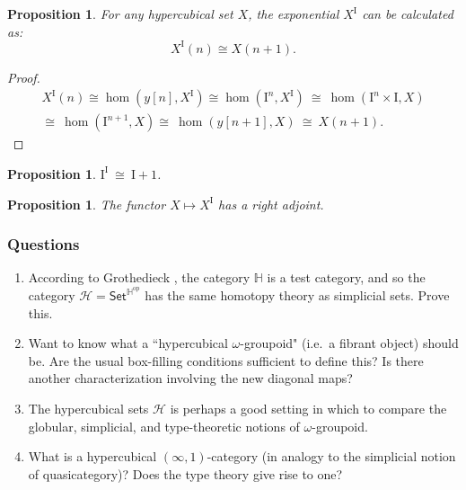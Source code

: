 \documentclass[11pt]{article}
\newcommand{\psh}[1]{\ensuremath{\mathsf{Set}^{#1^{\mathrm{op}}}}}
\newcommand{\I}{\ensuremath{\mathrm{I}}}
\renewcommand{\H}{\ensuremath{\mathbb{H}}}
\newcommand{\HH}{\ensuremath{\mathcal{H}}}
\newtheorem{proposition}[theorem]{Proposition}
\theoremstyle{remark}
\theoremstyle{definition}
\begin{document}
\begin{proposition}
For any hypercubical set $X$, the exponential $X^\I$ can be calculated as:
\[
X^\I(n) \cong X(n+1).
\]
\end{proposition}

\begin{proof}
\[
\begin{split}
X^\I(n) \cong \hom(y[n], X^\I) \cong \hom(\I^n, X^\I)\ \cong\ \hom(\I^n\times \I, X)\\
\cong\ \hom(\I^{n+1}, X)\cong\ \hom(y[n+1], X)\ \cong\ X(n+1).
\end{split}
\]
\end{proof}

\begin{proposition}
\quad $\I^\I\ \cong\ \I+1$.
\end{proposition}


\begin{proposition}
The functor $X \mapsto X^\I$ has a \emph{right} adjoint.
\end{proposition}


\subsubsection*{Questions}
\begin{enumerate}
\item According to Grothedieck \cite{PS}, the category $\H$ is a test category, and so the category $\HH = \psh{\H}$ has the same homotopy theory as simplicial sets.  Prove this.

\item Want to know what a ``hypercubical $\omega$-groupoid" (i.e.\ a fibrant object) should be.  Are the usual box-filling conditions sufficient to define this? Is there another characterization involving the new diagonal maps?

\item The hypercubical sets $\HH$ is perhaps a good setting in which to compare the globular, simplicial, and type-theoretic notions of $\omega$-groupoid.

\item What is a hypercubical $(\infty, 1)$-category (in analogy to the simplicial notion of quasicategory)?  Does the type theory give rise to one?

\end{enumerate}
\end{document}
